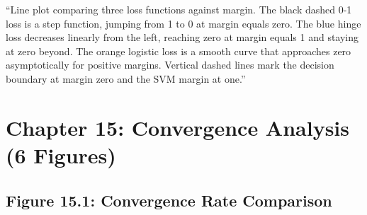 \documentclass[12pt]{article}
\begin{document}
\begin{description}[style=nextline, leftmargin=0pt]
    \item[Alt-Text for Accessibility]
    ``Line plot comparing three loss functions against margin. The black dashed 0-1 loss is a step function, jumping from 1 to 0 at margin equals zero. The blue hinge loss decreases linearly from the left, reaching zero at margin equals 1 and staying at zero beyond. The orange logistic loss is a smooth curve that approaches zero asymptotically for positive margins. Vertical dashed lines mark the decision boundary at margin zero and the SVM margin at one.''
\end{description}

\newpage

\section{Chapter 15: Convergence Analysis (6 Figures)}

\subsection{Figure 15.1: Convergence Rate Comparison}
\end{document}
